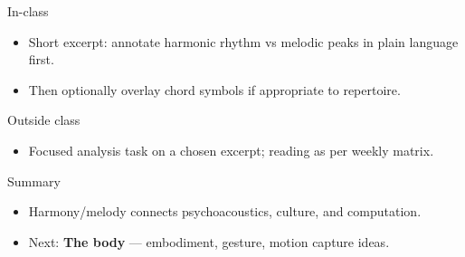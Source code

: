 \documentclass[aspectratio=169]{beamer}
\begin{document}
\begin{frame}{In-class}
  \begin{itemize}
    \item Short excerpt: annotate harmonic rhythm vs melodic peaks in plain language first.
    \item Then optionally overlay chord symbols if appropriate to repertoire.
  \end{itemize}
\end{frame}

\begin{frame}{Outside class}
  \begin{itemize}
    \item Focused analysis task on a chosen excerpt; reading as per weekly matrix.
  \end{itemize}
\end{frame}

\begin{frame}{Summary}
  \begin{itemize}
    \item Harmony/melody connects psychoacoustics, culture, and computation.
    \item Next: \textbf{The body} — embodiment, gesture, motion capture ideas.
  \end{itemize}
\end{frame}
\end{document}
